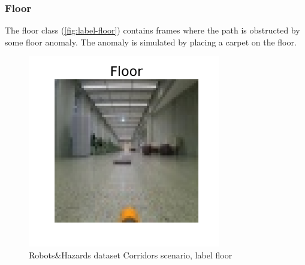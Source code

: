         \subsubsection*{Floor}
            The floor class (\autoref{fig:label-floor}) contains frames where the path is obstructed by some floor anomaly. The anomaly is simulated by placing a carpet on the floor.
            \begin{figure}[H]
                \centering
                \centerline{\includegraphics[width=0.75\textwidth]{img/labels/floor.png}}
                \caption{Robots\&Hazards dataset Corridors scenario, label floor}
                \label{fig:label-floor}
            \end{figure}
        

